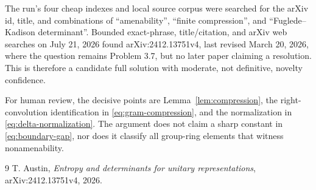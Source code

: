 \documentclass[11pt]{article}
\begin{document}
The run's four cheap indexes and local source corpus were searched for the
arXiv id, title, and combinations of ``amenability'', ``finite compression'',
and ``Fuglede--Kadison determinant''.  Bounded exact-phrase, title/citation,
and arXiv web searches on July 21, 2026 found arXiv:2412.13751v4, last revised
March 20, 2026, where the question remains Problem 3.7, but no later paper
claiming a resolution.  This is therefore a candidate full solution with
moderate, not definitive, novelty confidence.

For human review, the decisive points are Lemma~\ref{lem:compression}, the
right-convolution identification in \eqref{eq:gram-compression}, and the
normalization in \eqref{eq:delta-normalization}.  The argument does not claim
a sharp constant in \eqref{eq:boundary-gap}, nor does it classify all
group-ring elements that witness nonamenability.

\begin{thebibliography}{9}
T. Austin,
\emph{Entropy and determinants for unitary representations},
arXiv:2412.13751v4, 2026.
\end{thebibliography}
\end{document}
